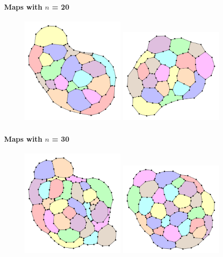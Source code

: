 \documentclass[t,18pt]{beamer}
\begin{document}
\begin{frame}
  \frametitle{}
  \framesubtitle{Maps with $n$ = 20}
  \begin{figure}
    \includegraphics[width=5cm]{../Thesis/Resources/Evaluation-Example-n20-450053F2-5F0A-4CFE-8A08-92CC201A07B9-0.pdf}
    \quad
    \includegraphics[width=5cm]{../Thesis/Resources/Evaluation-Example-n20-AE097F3A-14FD-4735-A19B-8FD343CA3346-0.pdf}
  \end{figure}
\end{frame}

\begin{frame}
  \frametitle{}
  \framesubtitle{Maps with $n$ = 30}
  \begin{figure}
    \includegraphics[width=5cm]{../Thesis/Resources/Evaluation-Example-n30-9BA67779-50C2-483B-8E81-916125D5D3F7-0.pdf}
    \quad
    \includegraphics[width=5cm]{../Thesis/Resources/Evaluation-Example-n30-45D8EAD2-210C-4F04-8C7F-EA3E65484875-0.pdf}
  \end{figure}
\end{frame}
\end{document}
